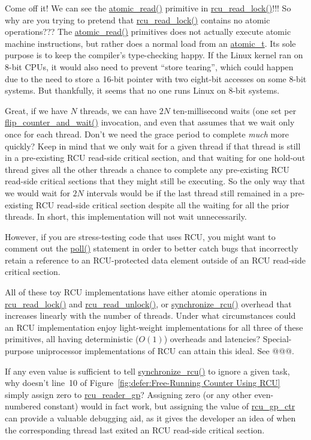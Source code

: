\QuickQ{}
	Come off it!
	We can see the \url{atomic_read()} primitive in
	\url{rcu_read_lock()}!!!
	So why are you trying to pretend that \url{rcu_read_lock()}
	contains no atomic operations???
\QuickA{}
	The \url{atomic_read()} primitives does not actually execute
	atomic machine instructions, but rather does a normal load
	from an \url{atomic_t}.
	Its sole purpose is to keep the compiler's type-checking happy.
	If the Linux kernel ran on 8-bit CPUs, it would also need to
	prevent ``store tearing'', which could happen due to the need
	to store a 16-bit pointer with two eight-bit accesses on some
	8-bit systems.
	But thankfully, it seems that no one runs Linux on 8-bit systems.

\QuickQ{}
	Great, if we have $N$ threads, we can have $2N$ ten-millisecond
	waits (one set per \url{flip_counter_and_wait()} invocation,
	and even that assumes that we wait only once for each thread.
	Don't we need the grace period to complete \emph{much} more quickly?
\QuickA{}
	Keep in mind that we only wait for a given thread if that thread
	is still in a pre-existing RCU read-side critical section,
	and that waiting for one hold-out thread gives all the other
	threads a chance to complete any pre-existing RCU read-side
	critical sections that they might still be executing.
	So the only way that we would wait for $2N$ intervals
	would be if the last thread still remained in a pre-existing
	RCU read-side critical section despite all the waiting for
	all the prior threads.
	In short, this implementation will not wait unnecessarily.

	However, if you are stress-testing code that uses RCU, you
	might want to comment out the \url{poll()} statement in
	order to better catch bugs that incorrectly retain a reference
	to an RCU-protected data element outside of an RCU
	read-side critical section.

\QuickQ{}
	All of these toy RCU implementations have either atomic operations
	in \url{rcu_read_lock()} and \url{rcu_read_unlock()},
	or \url{synchronize_rcu()}
	overhead that increases linearly with the number of threads.
	Under what circumstances could an RCU implementation enjoy
	light-weight implementations for all three of these primitives,
	all having deterministic ($O(1)$) overheads and latencies?
\QuickA{}
	Special-purpose uniprocessor implementations of RCU can attain
	this ideal.
	See @@@.

\QuickQ{}
	If any even value is sufficient to tell \url{synchronize_rcu()}
	to ignore a given task, why doesn't line~10 of
	Figure~\ref{fig:defer:Free-Running Counter Using RCU}
	simply assign zero to \url{rcu_reader_gp}?
\QuickA{}
	Assigning zero (or any other even-numbered constant)
	would in fact work, but assigning the value of
	\url{rcu_gp_ctr} can provide a valuable debugging aid,
	as it gives the developer an idea of when the corresponding
	thread last exited an RCU read-side critical section.

